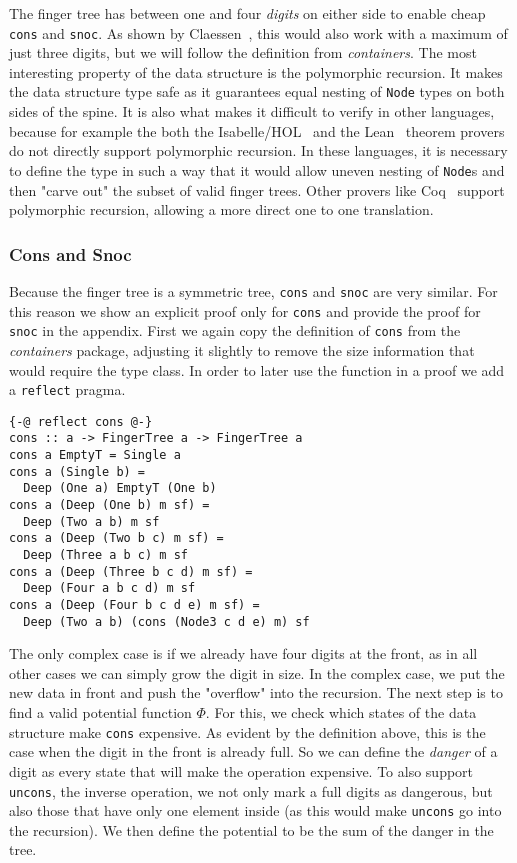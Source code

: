 \documentclass[sigplan,screen,review,anonymous]{acmart}
\begin{document}
The finger tree has between one and four \textit{digits} on either side to enable cheap \texttt{cons} and \texttt{snoc}. As shown by Claessen~\cite{fingertrees_new}, this would also work with a maximum of just three digits, but we will follow the definition from \textit{containers}. The most interesting property of the data structure is the polymorphic recursion. It makes the data structure type safe as it guarantees equal nesting of \texttt{Node} types on both sides of the spine. It is also what makes it difficult to verify in other languages, because for example the both the Isabelle/HOL~\cite{isabelle} and the Lean~\cite{lean} theorem provers do not directly support polymorphic recursion. In these languages, it is necessary to define the type in such a way that it would allow uneven nesting of \texttt{Node}s and then "carve out" the subset of valid finger trees. Other provers like Coq~\cite{coq} support polymorphic recursion, allowing a more direct one to one translation.

\subsubsection{Cons and Snoc}

Because the finger tree is a symmetric tree, \texttt{cons} and \texttt{snoc} are very similar. For this reason we show an explicit proof only for \texttt{cons} and provide the proof for \texttt{snoc} in the appendix. First we again copy the definition of \texttt{cons} from the \textit{containers} package, adjusting it slightly to remove the size information that would require the type class. In order to later use the function in a proof we add a \texttt{reflect} pragma.

\begin{lstlisting}
{-@ reflect cons @-}
cons :: a -> FingerTree a -> FingerTree a
cons a EmptyT = Single a
cons a (Single b) =
  Deep (One a) EmptyT (One b)
cons a (Deep (One b) m sf) =
  Deep (Two a b) m sf
cons a (Deep (Two b c) m sf) =
  Deep (Three a b c) m sf
cons a (Deep (Three b c d) m sf) =
  Deep (Four a b c d) m sf
cons a (Deep (Four b c d e) m sf) =
  Deep (Two a b) (cons (Node3 c d e) m) sf
\end{lstlisting}

The only complex case is if we already have four digits at the front, as in all other cases we can simply grow the digit in size. In the complex case, we put the new data in front and push the "overflow" into the recursion. The next step is to find a valid potential function $\Phi$. For this, we check which states of the data structure make \texttt{cons} expensive. As evident by the definition above, this is the case when the digit in the front is already full. So we can define the \textit{danger} of a digit as every state that will make the operation expensive. To also support \texttt{uncons}, the inverse operation, we not only mark a full digits as dangerous, but also those that have only one element inside (as this would make \texttt{uncons} go into the recursion). We then define the potential to be the sum of the danger in the tree.
\end{document}
